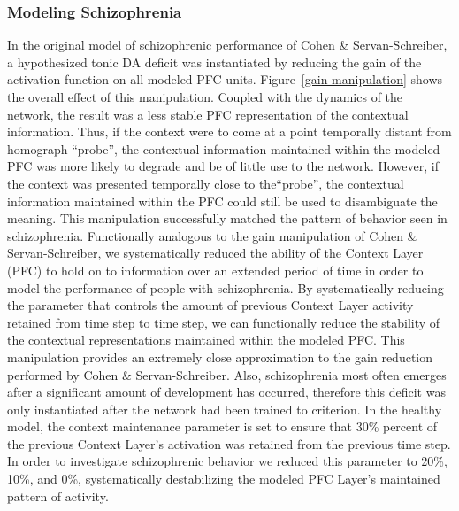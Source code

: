 \subsubsection{Modeling Schizophrenia}
In the original model of schizophrenic performance of Cohen \& Servan-Schreiber, a hypothesized tonic DA deficit was instantiated by reducing the gain of the activation function on all modeled PFC units. Figure~\ref{gain-manipulation} shows the overall effect of this manipulation.  Coupled with the dynamics of the network, the result was a less stable PFC representation of the contextual information.  Thus, if the context were to come at a point temporally distant from homograph ``probe'', the contextual information maintained within the modeled PFC was more likely to degrade and be of little use to the network.  However, if the context was presented temporally close to the``probe'', the contextual information maintained within the PFC could still be used to disambiguate the meaning.  This manipulation successfully matched the pattern of behavior seen in schizophrenia.  Functionally analogous to the gain manipulation of Cohen \& Servan-Schreiber, we systematically reduced the ability of the Context Layer (PFC) to hold on to information over an extended period of time in order to model the performance of people with schizophrenia.  By systematically reducing the parameter that controls the amount of previous Context Layer activity retained from time step to time step, we can functionally reduce the stability of the contextual representations maintained within the modeled PFC.  This manipulation provides an extremely close approximation to the gain reduction performed by Cohen \& Servan-Schreiber.   Also, schizophrenia most often emerges after a significant amount of development has occurred, therefore this deficit was only instantiated after the network had been trained to criterion.  In the healthy model, the context maintenance parameter is set to ensure that 30\% percent of the previous Context Layer's activation was retained from the previous time step.  In order to investigate schizophrenic behavior we reduced this parameter to 20\%, 10\%, and 0\%, systematically destabilizing the modeled PFC Layer's maintained pattern of activity. 
